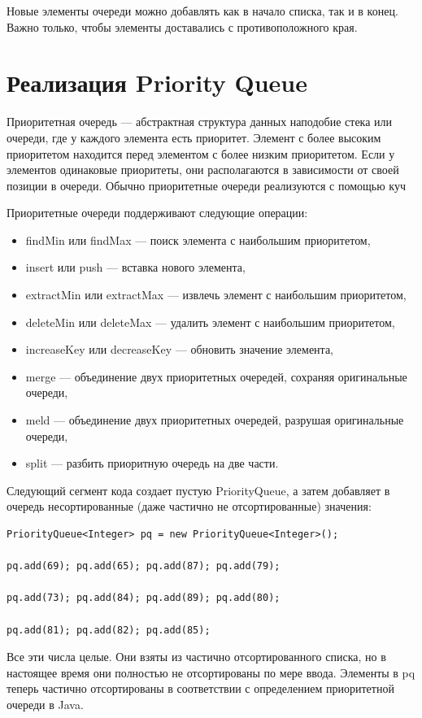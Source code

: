 Новые элементы очереди можно добавлять как в начало списка, так и в конец. Важно только, чтобы элементы доставались с противоположного края.

\section{Реализация Priority Queue}

Приоритетная очередь — абстрактная структура данных наподобие стека или очереди, где у каждого элемента есть приоритет. Элемент с более высоким приоритетом находится перед элементом с более низким приоритетом. Если у элементов одинаковые приоритеты, они располагаются в зависимости от своей позиции в очереди. Обычно приоритетные очереди реализуются с помощью куч

Приоритетные очереди поддерживают следующие операции:

\begin{itemize}
\item findMin или findMax — поиск элемента с наибольшим приоритетом,
\item insert или push — вставка нового элемента,
\item extractMin или extractMax — извлечь элемент с наибольшим приоритетом,
\item deleteMin или deleteMax — удалить элемент с наибольшим приоритетом,
\item increaseKey или decreaseKey — обновить значение элемента,
\item merge — объединение двух приоритетных очередей, сохраняя оригинальные очереди,
\item meld — объединение двух приоритетных очередей, разрушая оригинальные очереди,
\item split — разбить приоритную очередь на две части.
\end{itemize}

Следующий сегмент кода создает пустую PriorityQueue, а затем добавляет в очередь несортированные (даже частично не отсортированные) значения:

\begin{lstlisting}
PriorityQueue<Integer> pq = new PriorityQueue<Integer>();

pq.add(69); pq.add(65); pq.add(87); pq.add(79);

pq.add(73); pq.add(84); pq.add(89); pq.add(80);

pq.add(81); pq.add(82); pq.add(85);
\end{lstlisting}

Все эти числа целые. Они взяты из частично отсортированного списка, но в настоящее время они полностью не отсортированы по мере ввода. Элементы в pq теперь частично отсортированы в соответствии с определением приоритетной очереди в Java. %

